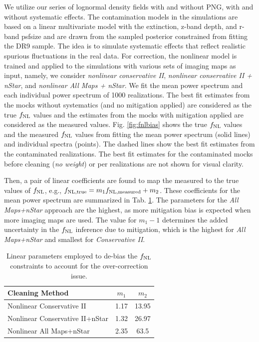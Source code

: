 We utilize our series of lognormal density fields with and without PNG, with and without systematic effects. The contamination models in the simulations are based on a linear multivariate model with the extinction, z-band depth, and r-band psfsize and are drawn from the sampled posterior constrained from fitting the DR9 sample. The idea is to simulate systematic effects that reflect realistic spurious fluctuations in the real data. For correction, the nonlinear model is trained and applied to the simulations with various sets of imaging maps as input, namely, we consider \textit{nonlinear conservative II}, \textit{nonlinear conservative II + nStar}, and \textit{nonlinear All Maps + nStar}. We fit the mean power spectrum and each individual power spectrum of 1000 realizations. The best fit estimates from the mocks without systematics (and no mitigation applied) are considered as the true $f_{\rm NL}$ values and the estimates from the mocks with mitigation applied are considered as the measured values. Fig. \ref{fig:fnlbias} shows the true $f_{\rm NL}$ values and the measured $f_{\rm NL}$ values from fitting the mean power spectrum (solid lines) and individual spectra (points). The dashed lines show the best fit estimates from the contaminated realizations. The best fit estimates for the contaminated mocks before cleaning (\textit{no weight}) or per realizations are not shown for visual clarity. 

Then, a pair of linear coefficients are found to map the measured to the true values of $f_{\rm NL}$, e.g., $f_{\rm NL, true} = m_{1} f_{\rm NL, measured} + m_{2}$. These coefficients for the mean power spectrum are summarized in Tab. \ref{tab:debiasparams}. The parameters for the \textit{All Maps+nStar} approach are the highest, as more mitigation bias is expected when more imaging maps are used. The value for $m_{1}-1$ determines the added uncertainty in the $f_{\rm NL}$ inference due to mitigation, which is the highest for \textit{All Maps+nStar} and smallest for \textit{Conservative II}.

\begin{table}
\begin{center}
\caption{Linear parameters employed to de-bias the $f_{\rm NL}$ constraints to account for the over-correction issue.}\label{tab:debiasparams}
\begin{tabular}{lcc}
\hline
\hline
\textbf{Cleaning Method} & $m_{1}$ & $m_{2}$ \\
\hline
Nonlinear Conservative II & 1.17 & 13.95 \\
Nonlinear Conservative II+nStar & 1.32 & 26.97 \\
Nonlinear All Maps+nStar & 2.35 & 63.5\\
\hline
\end{tabular}
\end{center}
\end{table}